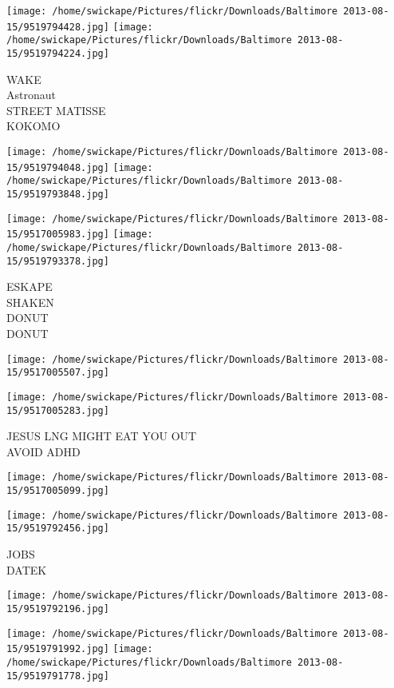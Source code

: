 \documentclass[10pt,letterpaper]{article}
\begin{document}
\texttt{[image: /home/swickape/Pictures/flickr/Downloads/Baltimore 2013-08-15/9519794428.jpg]}
\texttt{[image: /home/swickape/Pictures/flickr/Downloads/Baltimore 2013-08-15/9519794224.jpg]}

WAKE\\
Astronaut\\
STREET MATISSE\\
KOKOMO
\pagebreak

\texttt{[image: /home/swickape/Pictures/flickr/Downloads/Baltimore 2013-08-15/9519794048.jpg]}
\texttt{[image: /home/swickape/Pictures/flickr/Downloads/Baltimore 2013-08-15/9519793848.jpg]}

\texttt{[image: /home/swickape/Pictures/flickr/Downloads/Baltimore 2013-08-15/9517005983.jpg]}
\texttt{[image: /home/swickape/Pictures/flickr/Downloads/Baltimore 2013-08-15/9519793378.jpg]}

ESKAPE\\
SHAKEN\\
DONUT\\
DONUT
\pagebreak

\texttt{[image: /home/swickape/Pictures/flickr/Downloads/Baltimore 2013-08-15/9517005507.jpg]}

\vspace{0.25in}
\texttt{[image: /home/swickape/Pictures/flickr/Downloads/Baltimore 2013-08-15/9517005283.jpg]}

JESUS LNG MIGHT EAT YOU OUT\\
AVOID ADHD
\pagebreak

\texttt{[image: /home/swickape/Pictures/flickr/Downloads/Baltimore 2013-08-15/9517005099.jpg]}

\vspace{0.25in}
\texttt{[image: /home/swickape/Pictures/flickr/Downloads/Baltimore 2013-08-15/9519792456.jpg]}

JOBS\\
DATEK
\pagebreak

\texttt{[image: /home/swickape/Pictures/flickr/Downloads/Baltimore 2013-08-15/9519792196.jpg]}

\vspace{0.25in}
\texttt{[image: /home/swickape/Pictures/flickr/Downloads/Baltimore 2013-08-15/9519791992.jpg]}
\texttt{[image: /home/swickape/Pictures/flickr/Downloads/Baltimore 2013-08-15/9519791778.jpg]}
\end{document}
